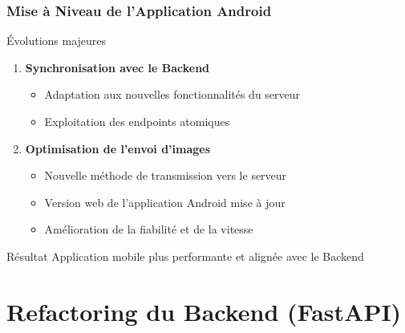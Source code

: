 \documentclass[
	11pt,
	aspectratio=169,
]{beamer}
\begin{document}
\begin{frame}
	\frametitle{Mise à Niveau de l'Application Android}
	
	\begin{block}{Évolutions majeures}
		\begin{enumerate}
			\item \textbf{Synchronisation avec le Backend}
			\begin{itemize}
				\item Adaptation aux nouvelles fonctionnalités du serveur
				\item Exploitation des endpoints atomiques
			\end{itemize}
			
			\bigskip
			
			\item \textbf{Optimisation de l'envoi d'images}
			\begin{itemize}
				\item Nouvelle méthode de transmission vers le serveur
				\item Version web de l'application Android mise à jour
				\item Amélioration de la fiabilité et de la vitesse
			\end{itemize}
		\end{enumerate}
	\end{block}
	
	\bigskip
	
	\begin{alertblock}{Résultat}
		Application mobile plus performante et alignée avec le Backend
	\end{alertblock}
\end{frame}


\section{Refactoring du Backend (FastAPI)}
\end{document}
